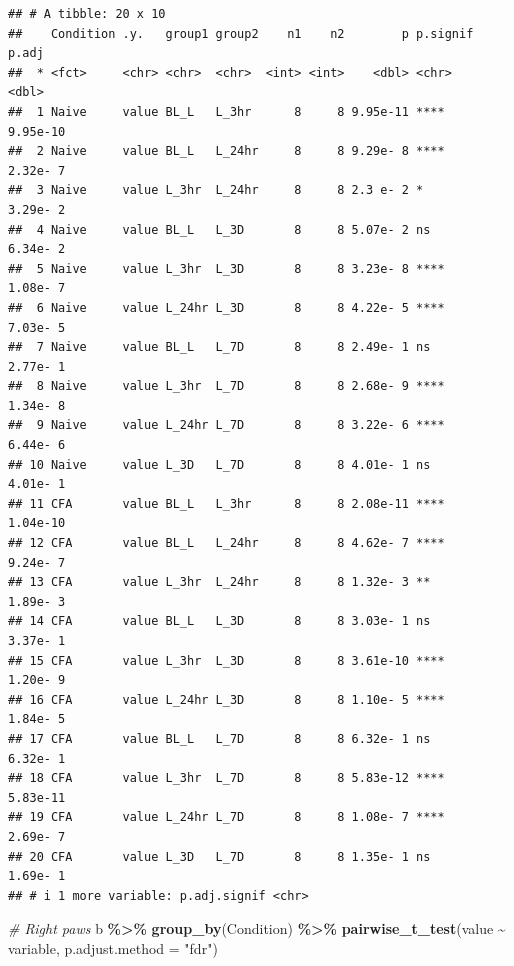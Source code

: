 \documentclass[
]{book}
\newenvironment{Shaded}{\begin{snugshade}}{\end{snugshade}}
\newcommand{\AttributeTok}[1]{\textcolor[rgb]{0.13,0.29,0.53}{#1}}
\newcommand{\CommentTok}[1]{\textcolor[rgb]{0.56,0.35,0.01}{\textit{#1}}}
\newcommand{\FunctionTok}[1]{\textcolor[rgb]{0.13,0.29,0.53}{\textbf{#1}}}
\newcommand{\NormalTok}[1]{#1}
\newcommand{\SpecialCharTok}[1]{\textcolor[rgb]{0.81,0.36,0.00}{\textbf{#1}}}
\newcommand{\StringTok}[1]{\textcolor[rgb]{0.31,0.60,0.02}{#1}}
\begin{document}
\begin{verbatim}
## # A tibble: 20 x 10
##    Condition .y.   group1 group2    n1    n2        p p.signif    p.adj
##  * <fct>     <chr> <chr>  <chr>  <int> <int>    <dbl> <chr>       <dbl>
##  1 Naive     value BL_L   L_3hr      8     8 9.95e-11 ****     9.95e-10
##  2 Naive     value BL_L   L_24hr     8     8 9.29e- 8 ****     2.32e- 7
##  3 Naive     value L_3hr  L_24hr     8     8 2.3 e- 2 *        3.29e- 2
##  4 Naive     value BL_L   L_3D       8     8 5.07e- 2 ns       6.34e- 2
##  5 Naive     value L_3hr  L_3D       8     8 3.23e- 8 ****     1.08e- 7
##  6 Naive     value L_24hr L_3D       8     8 4.22e- 5 ****     7.03e- 5
##  7 Naive     value BL_L   L_7D       8     8 2.49e- 1 ns       2.77e- 1
##  8 Naive     value L_3hr  L_7D       8     8 2.68e- 9 ****     1.34e- 8
##  9 Naive     value L_24hr L_7D       8     8 3.22e- 6 ****     6.44e- 6
## 10 Naive     value L_3D   L_7D       8     8 4.01e- 1 ns       4.01e- 1
## 11 CFA       value BL_L   L_3hr      8     8 2.08e-11 ****     1.04e-10
## 12 CFA       value BL_L   L_24hr     8     8 4.62e- 7 ****     9.24e- 7
## 13 CFA       value L_3hr  L_24hr     8     8 1.32e- 3 **       1.89e- 3
## 14 CFA       value BL_L   L_3D       8     8 3.03e- 1 ns       3.37e- 1
## 15 CFA       value L_3hr  L_3D       8     8 3.61e-10 ****     1.20e- 9
## 16 CFA       value L_24hr L_3D       8     8 1.10e- 5 ****     1.84e- 5
## 17 CFA       value BL_L   L_7D       8     8 6.32e- 1 ns       6.32e- 1
## 18 CFA       value L_3hr  L_7D       8     8 5.83e-12 ****     5.83e-11
## 19 CFA       value L_24hr L_7D       8     8 1.08e- 7 ****     2.69e- 7
## 20 CFA       value L_3D   L_7D       8     8 1.35e- 1 ns       1.69e- 1
## # i 1 more variable: p.adj.signif <chr>
\end{verbatim}

\begin{Shaded}
\begin{Highlighting}[]
\CommentTok{\# Right paws}
\NormalTok{b }\SpecialCharTok{\%\textgreater{}\%}
  \FunctionTok{group\_by}\NormalTok{(Condition) }\SpecialCharTok{\%\textgreater{}\%}
  \FunctionTok{pairwise\_t\_test}\NormalTok{(value }\SpecialCharTok{\textasciitilde{}}\NormalTok{ variable, }\AttributeTok{p.adjust.method =} \StringTok{"fdr"}\NormalTok{)}
\end{Highlighting}
\end{Shaded}
\end{document}
